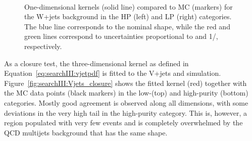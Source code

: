 \begin{figure}[h]
\centering
{}
\\
\caption{One-dimensional \MVV kernels (solid line) compared to MC (markers) for the W+jets background in the HP (left) and LP (right) categories. The blue line corresponds to the nominal shape, while the red and green lines correspond to uncertainties proportional to \MVV and 1/\MVV, respectively.}
\label{fig:Vjets_mvv}
\end{figure}
As a closure test, the three-dimensional kernel as defined in Equation~\ref{eq:searchIII:vjetpdf} is fitted to the V+jets and \ttbar simulation. Figure~\ref{fig:searchIII:Vjets_closure} shows the fitted kernel (red) together with the MC data points (black markers) in the low-(top) and high-purity (bottom) categories. Mostly good agreement is observed along all dimensions, with some deviations in the very high \MVV tail in the high-purity category. This is, however, a region populated with very few events and is completely overwhelmed by the QCD multijets background that has the same shape.

